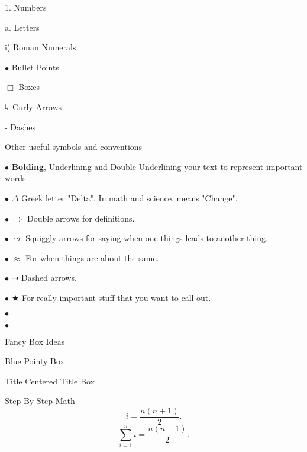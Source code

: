 \documentclass[../../main.tex]{subfiles}
\begin{document}
\begin{outline}[enumerate]
\begin{displayquote}
	1. Numbers

	\quad a. Letters

	\quad \quad i) Roman Numerals

	\quad \(\bullet\) Bullet Points

	\quad \quad $\Box$ Boxes

	\quad $\rotatebox[origin=c]{180}{$\Lsh$}$ Curly Arrows

	\quad \quad - Dashes
	\end{displayquote}


	\1 Other useful symbols and conventions

	$\bullet$ \quad \textbf{Bolding}, \underline{Underlining} and \underline{\underline{Double Underlining}} your text to represent important words.

	$\bullet$ \quad $\Delta$ Greek letter "Delta".  In math and science, means "Change".

	$\bullet$ \quad $\Rightarrow$ Double arrows for definitions.

	$\bullet$ \quad $\leadsto$ Squiggly arrows for saying when one things leads to another thing.

	$\bullet$ \quad $\approx$ For when things are about the same.

	$\bullet$ \quad $\dashrightarrow$ Dashed arrows.

	$\bullet$ \quad $\bigstar$ For really important stuff that you want to call out.

	$\bullet$ \quad {}

	$\bullet$ \quad {}

	\1 Fancy Box Ideas

	\begin{boxBluePointy}
		Blue Pointy Box
	\end{boxBluePointy}

	\begin{boxBoxTitle}{Title}
		Centered Title Box
	\end{boxBoxTitle}

	\begin{boxcompare}{Step By Step Math}
		\begin{equation}
		i = \frac{n(n+1)}{2}.
		\end{equation}
		\tcblower
		\begin{equation}
		\sum\limits_{i=1}^n i = \frac{n(n+1)}{2}.
		\end{equation}
	\end{boxcompare}




\end{outline}
\end{document}
